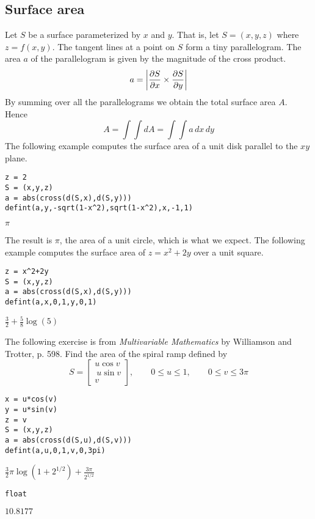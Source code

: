 
\subsection{Surface area}
Let $S$ be a surface parameterized by $x$ and $y$.
That is, let $S=(x,y,z)$ where $z=f(x,y)$.
The tangent lines at a point on $S$ form a tiny parallelogram.
The area $a$ of the parallelogram is given by the magnitude of the cross product.
$$a=\left|{\partial S\over\partial x}\times{\partial S\over\partial y}\right|$$
By summing over all the parallelograms we obtain the total surface area $A$.
Hence
$$A=\int\!\!\!\int dA=\int\!\!\!\int a\,dx\,dy$$
The following example computes the surface area of a unit disk
parallel to the $xy$ plane.

\begin{Verbatim}[formatcom=\color{blue},samepage=true]
z = 2
S = (x,y,z)
a = abs(cross(d(S,x),d(S,y)))
defint(a,y,-sqrt(1-x^2),sqrt(1-x^2),x,-1,1)
\end{Verbatim}

$\displaystyle \pi$

The result is $\pi$, the area of a unit circle, which is what we expect.
The following example computes the surface area of $z=x^2+2y$ over
a unit square.

\begin{Verbatim}[formatcom=\color{blue},samepage=true]
z = x^2+2y
S = (x,y,z)
a = abs(cross(d(S,x),d(S,y)))
defint(a,x,0,1,y,0,1)
\end{Verbatim}

$\displaystyle \frac{3}{2}+\frac{5}{8}\log(5)$

The following exercise is from
{\it Multivariable Mathematics} by Williamson and Trotter, p. 598.
Find the area of the spiral ramp defined by
$$S=\begin{bmatrix}u\cos v\\\ u\sin v\\ v\end{bmatrix},\qquad 0\le u\le1,\qquad 0\le v\le3\pi$$

\begin{Verbatim}[formatcom=\color{blue},samepage=true]
x = u*cos(v)
y = u*sin(v)
z = v
S = (x,y,z)
a = abs(cross(d(S,u),d(S,v)))
defint(a,u,0,1,v,0,3pi)
\end{Verbatim}

$\displaystyle \frac{3}{2}\pi\log(1+2^{1/2})+\frac{3\pi}{2^{1/2}}$

\begin{Verbatim}[formatcom=\color{blue},samepage=true]
float
\end{Verbatim}

$\displaystyle 10.8177$
